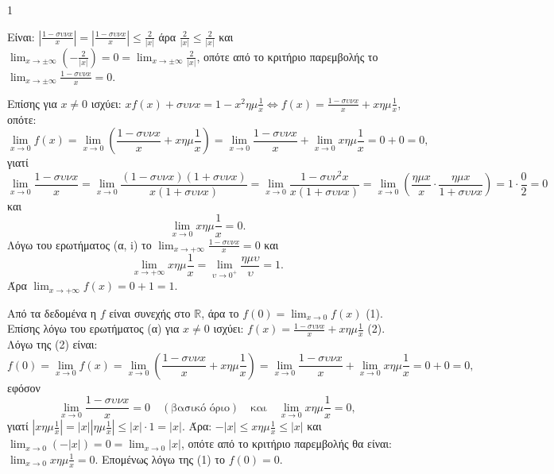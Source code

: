 \begin{ylh}{1}
    \item [Ύλη από εικόνα]
\end{ylh}
\begin{alist}
\item
    \begin{rlist}
    \item Είναι: \( \left| \frac{1-\sigma\upsilon\nu x}{x} \right| = \left| \frac{1-\sigma\upsilon\nu x}{x} \right| \leq \frac{2}{|x|} \)
    άρα \( \frac{2}{|x|} \leq \frac{2}{|x|} \) και \( \lim_{x \to \pm \infty} \left( - \frac{2}{|x|} \right) = 0 = \lim_{x \to \pm \infty} \frac{2}{|x|} \),
    οπότε από το κριτήριο παρεμβολής το \( \lim_{x \to \pm \infty} \frac{1-\sigma\upsilon\nu x}{x} = 0 \).

    \item Επίσης για \( x \neq 0 \) ισχύει: \( x f(x) + \sigma\upsilon\nu x = 1 - x^2 \eta \mu \frac{1}{x} \Leftrightarrow f(x) = \frac{1-\sigma\upsilon\nu x}{x} + x \eta \mu \frac{1}{x} \), οπότε:
    \[ \lim_{x \to 0} f(x) = \lim_{x \to 0} \left( \frac{1-\sigma\upsilon\nu x}{x} + x \eta \mu \frac{1}{x} \right) = \lim_{x \to 0} \frac{1-\sigma\upsilon\nu x}{x} + \lim_{x \to 0} x \eta \mu \frac{1}{x} = 0 + 0 = 0, \]
    γιατί
    \[ \lim_{x \to 0} \frac{1-\sigma\upsilon\nu x}{x} = \lim_{x \to 0} \frac{(1-\sigma\upsilon\nu x)(1+\sigma\upsilon\nu x)}{x(1+\sigma\upsilon\nu x)} = \lim_{x \to 0} \frac{1-\sigma\upsilon\nu^2 x}{x(1+\sigma\upsilon\nu x)} = \lim_{x \to 0} \left( \frac{\eta \mu x}{x} \cdot \frac{\eta \mu x}{1+\sigma\upsilon\nu x} \right) = 1 \cdot \frac{0}{2} = 0 \]
    και
    \[ \lim_{x \to 0} x \eta \mu \frac{1}{x} = 0. \]
    Λόγω του ερωτήματος (α, i) το \( \lim_{x \to + \infty} \frac{1-\sigma\upsilon\nu x}{x} = 0 \) και
    \[ \lim_{x \to + \infty} x \eta \mu \frac{1}{x} = \lim_{\upsilon \to 0^+} \frac{\eta \mu \upsilon}{\upsilon} = 1. \]
    Άρα \( \lim_{x \to + \infty} f(x) = 0+1=1 \).
    \end{rlist}

\item Από τα δεδομένα η $f$ είναι συνεχής στο $\mathbb{R}$, άρα το $f(0) = \lim_{x \to 0} f(x)$ (1).
Επίσης λόγω του ερωτήματος (α) για $x \neq 0$ ισχύει: \( f(x) = \frac{1-\sigma\upsilon\nu x}{x} + x \eta \mu \frac{1}{x} \) (2).
Λόγω της (2) είναι:
\[ f(0) = \lim_{x \to 0} f(x) = \lim_{x \to 0} \left( \frac{1-\sigma\upsilon\nu x}{x} + x \eta \mu \frac{1}{x} \right) = \lim_{x \to 0} \frac{1-\sigma\upsilon\nu x}{x} + \lim_{x \to 0} x \eta \mu \frac{1}{x} = 0+0=0, \]
εφόσον
\[ \lim_{x \to 0} \frac{1-\sigma\upsilon\nu x}{x} = 0 \quad (\text{βασικό όριο}) \quad \text{και} \quad \lim_{x \to 0} x \eta \mu \frac{1}{x} = 0, \]
γιατί \( \left| x \eta \mu \frac{1}{x} \right| = |x| \left| \eta \mu \frac{1}{x} \right| \leq |x| \cdot 1 = |x| \). Άρα: \( -|x| \leq x \eta \mu \frac{1}{x} \leq |x| \) και \( \lim_{x \to 0} (-|x|) = 0 = \lim_{x \to 0} |x| \), οπότε από το κριτήριο παρεμβολής θα είναι: \( \lim_{x \to 0} x \eta \mu \frac{1}{x} = 0 \). Επομένως λόγω της (1) το $f(0)=0$.


\end{alist}

